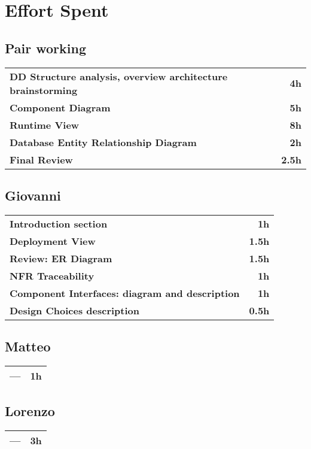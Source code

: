 \section{Effort Spent}
\subsection*{Pair working}
\begin{table}[H]
    \begin{tabular}{lr}
        \toprule
        \textbf{DD Structure analysis, overview architecture brainstorming} & \textbf{4h} \\
        \textbf{Component Diagram}                                          & \textbf{5h} \\
        \textbf{Runtime View}                                               & \textbf{8h} \\
        \textbf{Database Entity Relationship Diagram}                       & \textbf{2h} \\
        \textbf{Final Review}                                               & \textbf{2.5h} \\
        \bottomrule
    \end{tabular}
\end{table}

\subsection*{Giovanni}
\begin{table}[H]
    \begin{tabular}{lr}
        \toprule
        \textbf{Introduction section}                          & \textbf{1h}   \\
        \textbf{Deployment View}                               & \textbf{1.5h} \\
        \textbf{Review: ER Diagram}                            & \textbf{1.5h} \\
        \textbf{NFR Traceability}                              & \textbf{1h}   \\
        \textbf{Component Interfaces: diagram and description} & \textbf{1h}   \\
        \textbf{Design Choices description}                                & \textbf{0.5h} \\
        \bottomrule
    \end{tabular}
\end{table}

\subsection*{Matteo}
\begin{table}[H]
    \begin{tabular}{lr}
        \toprule
        \textbf{---} & \textbf{1h} \\
        \bottomrule
    \end{tabular}
\end{table}

\subsection*{Lorenzo}
\begin{table}[H]
    \begin{tabular}{lr}
        \toprule
        \textbf{---} & \textbf{3h} \\
        \bottomrule
    \end{tabular}
\end{table}
